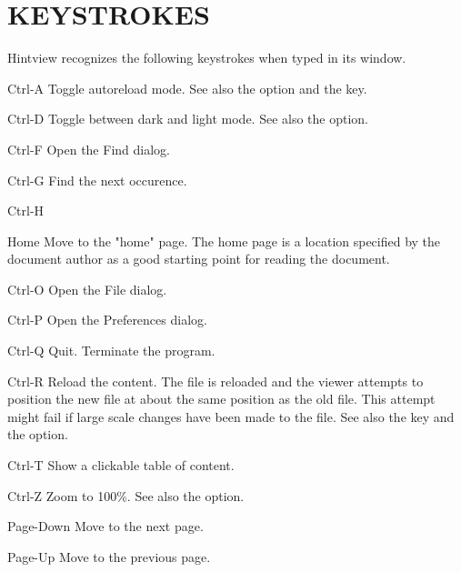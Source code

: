 \enditemize

\section{KEYSTROKES}
       Hintview recognizes the following keystrokes when typed in its window.

\itemize
\item{Ctrl-A} Toggle autoreload mode. See also the  option  and  the  
              key.

\item{Ctrl-D} Toggle between dark and light mode. See also the  option.

\item{Ctrl-F} Open the Find dialog.

\item{Ctrl-G} Find the next occurence.

\item{Ctrl-H}\item{Home}
              Move to the "home" page. The home page is a  location  specified
              by  the document author as a good starting point for reading the
              document.
  
\item{Ctrl-O} Open the File dialog.

\item{Ctrl-P} Open the Preferences dialog.
  
\item{Ctrl-Q} Quit. Terminate the program.

\item{Ctrl-R} Reload the content. The file is reloaded and the viewer attempts
              to position the new file at about the same position as  the  old
              file.  This  attempt might fail if large scale changes have been
              made to the file. See also the  key and the  option.

\item{Ctrl-T} Show a clickable table of content.

\item{Ctrl-Z} Zoom to 100\%. See also the  option.


\item{Page-Down}
              Move to the next page.

\item{Page-Up}
              Move to the previous page.

